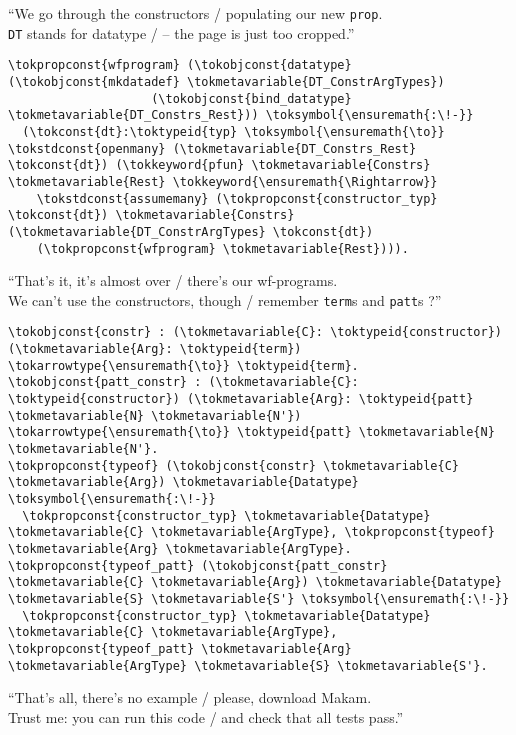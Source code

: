 \begin{versy}
``We go through the constructors / populating our new \texttt{prop}. \\
\texttt{DT} stands for datatype / -- the page is just too cropped.''
\end{versy}

\importantCodeblock{}

\begin{verbatim}
\tokpropconst{wfprogram} (\tokobjconst{datatype} (\tokobjconst{mkdatadef} \tokmetavariable{DT_ConstrArgTypes})
                    (\tokobjconst{bind_datatype} \tokmetavariable{DT_Constrs_Rest})) \toksymbol{\ensuremath{:\!-}}
  (\tokconst{dt}:\toktypeid{typ} \toksymbol{\ensuremath{\to}} \tokstdconst{openmany} (\tokmetavariable{DT_Constrs_Rest} \tokconst{dt}) (\tokkeyword{pfun} \tokmetavariable{Constrs} \tokmetavariable{Rest} \tokkeyword{\ensuremath{\Rightarrow}}
    \tokstdconst{assumemany} (\tokpropconst{constructor_typ} \tokconst{dt}) \tokmetavariable{Constrs} (\tokmetavariable{DT_ConstrArgTypes} \tokconst{dt})
    (\tokpropconst{wfprogram} \tokmetavariable{Rest}))).
\end{verbatim}

\importantCodeblockEnd{}

\begin{versy}
``That's it, it's almost over / there's our wf-programs. \\
We can't use the constructors, though / remember \texttt{term}s and \texttt{patt}s ?''
\end{versy}

\begin{verbatim}
\tokobjconst{constr} : (\tokmetavariable{C}: \toktypeid{constructor}) (\tokmetavariable{Arg}: \toktypeid{term}) \tokarrowtype{\ensuremath{\to}} \toktypeid{term}.
\tokobjconst{patt_constr} : (\tokmetavariable{C}: \toktypeid{constructor}) (\tokmetavariable{Arg}: \toktypeid{patt} \tokmetavariable{N} \tokmetavariable{N'}) \tokarrowtype{\ensuremath{\to}} \toktypeid{patt} \tokmetavariable{N} \tokmetavariable{N'}.
\tokpropconst{typeof} (\tokobjconst{constr} \tokmetavariable{C} \tokmetavariable{Arg}) \tokmetavariable{Datatype} \toksymbol{\ensuremath{:\!-}}
  \tokpropconst{constructor_typ} \tokmetavariable{Datatype} \tokmetavariable{C} \tokmetavariable{ArgType}, \tokpropconst{typeof} \tokmetavariable{Arg} \tokmetavariable{ArgType}.
\tokpropconst{typeof_patt} (\tokobjconst{patt_constr} \tokmetavariable{C} \tokmetavariable{Arg}) \tokmetavariable{Datatype} \tokmetavariable{S} \tokmetavariable{S'} \toksymbol{\ensuremath{:\!-}}
  \tokpropconst{constructor_typ} \tokmetavariable{Datatype} \tokmetavariable{C} \tokmetavariable{ArgType}, \tokpropconst{typeof_patt} \tokmetavariable{Arg} \tokmetavariable{ArgType} \tokmetavariable{S} \tokmetavariable{S'}.
\end{verbatim}

\begin{versy}
``That's all, there's no example / please, download Makam. \\
Trust me: you can run this code / and check that all tests pass.''
\end{versy}
